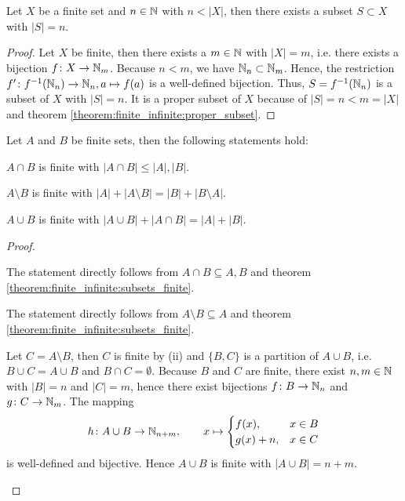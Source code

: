 \begin{theorem}
    Let $X$ be a finite set and $n\in\mathbb{N}$ with $n<|X|$, then there exists a subset $S\subset X$ with $|S|=n$.
\end{theorem}
\begin{proof}
    Let $X$ be finite, then there exists a $m\in\mathbb{N}$ with $|X|=m$, i.e. there exists a bijection $f\colon X\to\mathbb{N}_m$. Because $n<m$, we have $\mathbb{N}_n\subset\mathbb{N}_m$. Hence, the restriction $f'\colon f^{-1}(\mathbb{N}_n)\to\mathbb{N}_n, a\mapsto f(a)$ is a well-defined bijection. Thus, $S=f^{-1}(\mathbb{N}_n)$ is a subset of $X$ with $|S|=n$. It is a proper subset of $X$ because of $|S|=n<m=|X|$ and theorem \ref{theorem:finite_infinite:proper_subset}.
\end{proof}

\begin{theorem}
    Let $A$ and $B$ be finite sets, then the following statements hold:
    \begin{intheoremenumerate}
        \item $A\cap B$ is finite with $|A\cap B|\leq |A|,|B|$.
        \item $A\setminus B$ is finite with $|A|+|A\setminus B|=|B|+|B\setminus A|$.
        \item $A\cup B$ is finite with $|A\cup B|+|A\cap B|= |A|+|B|$.
    \end{intheoremenumerate}
\end{theorem}

\begin{proof}
    \begin{proofenumerate}
        \item The statement directly follows from $A\cap B\subseteq A,B$ and theorem \ref{theorem:finite_infinite:subsets_finite}.
        \item The statement directly follows from $A\setminus B\subseteq A$ and theorem \ref{theorem:finite_infinite:subsets_finite}.
        \item Let $C=A\setminus B$, then $C$ is finite by (ii) and $\{B,C\}$ is a partition of $A\cup B$, i.e. $B\cup C=A\cup B$ and $B\cap C=\emptyset$. Because $B$ and $C$ are finite, there exist $n,m\in\mathbb{N}$ with $|B|=n$ and $|C|=m$, hence there exist bijections $f\colon B\to\mathbb{N}_n$ and $g\colon C\to\mathbb{N}_m$. The mapping
        \begin{align}h\colon A\cup B\to\mathbb{N}_{n+m},\qquad x\mapsto \begin{cases}f(x), & x\in B \\ g(x)+n, & x\in C\end{cases}\end{align}
        is well-defined and bijective. Hence $A\cup B$ is finite with $|A\cup B|=n+m$.
    \end{proofenumerate}
\end{proof}

